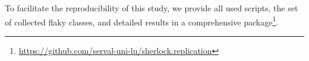     
        
    
     

To facilitate the reproducibility of this study, we provide all used scripts,  the set of collected flaky classes, and detailed results in a comprehensive package\footnote{\url{https://github.com/serval-uni-lu/sherlock.replication}}.

